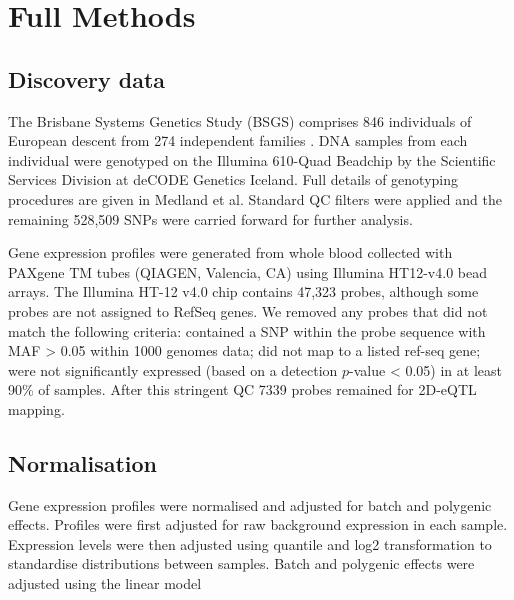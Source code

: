 \documentclass{article}
\begin{document}
\section{Full Methods}

\subsection{Discovery data}

The Brisbane Systems Genetics Study (BSGS) comprises 846 individuals of European descent from 274 independent families \cite{pmid22563384}. DNA samples from each individual were genotyped on the Illumina 610-Quad Beadchip by the Scientific Services Division at deCODE Genetics Iceland. Full details of genotyping procedures are given in Medland et al. \cite{Medland2009} Standard QC filters were applied and the remaining 528,509 SNPs were carried forward for further analysis. 

Gene expression profiles were generated from whole blood collected with PAXgene TM tubes (QIAGEN, Valencia, CA) using Illumina HT12-v4.0 bead arrays. The Illumina HT-12 v4.0 chip contains 47,323 probes, although some probes are not assigned to RefSeq genes. We removed any probes that did not match the following criteria: contained a SNP within the probe sequence with MAF > 0.05 within 1000 genomes data; did not map to a listed ref-seq gene; were not significantly expressed (based on a detection $p$-value < 0.05) in at least 90\% of samples. After this stringent QC 7339 probes remained for 2D-eQTL mapping.


\subsection{Normalisation}

Gene expression profiles were normalised and adjusted for batch and polygenic effects. Profiles were first adjusted for raw background expression in each sample. Expression levels were then adjusted using quantile and log2 transformation to standardise distributions between samples. Batch and polygenic effects were adjusted using the linear model
\end{document}
